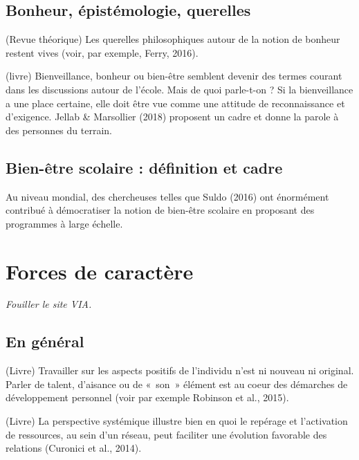 \documentclass[
  french,
]{article}
\begin{document}
\hypertarget{bonheur-uxe9pistuxe9mologie-querelles}{%
\subsection{Bonheur, épistémologie, querelles}\label{bonheur-uxe9pistuxe9mologie-querelles}}

(Revue théorique) Les querelles philosophiques autour de la notion de bonheur restent vives (voir, par exemple, Ferry, 2016).

(livre) Bienveillance, bonheur ou bien-être semblent devenir des termes courant dans les discussions autour de l'école. Mais de quoi parle-t-on ? Si la bienveillance a une place certaine, elle doit être vue comme une attitude de reconnaissance et d'exigence. Jellab \& Marsollier (2018) proposent un cadre et donne la parole à des personnes du terrain.

\hypertarget{bien-uxeatre-scolaire-duxe9finition-et-cadre}{%
\subsection{Bien-être scolaire : définition et cadre}\label{bien-uxeatre-scolaire-duxe9finition-et-cadre}}

Au niveau mondial, des chercheuses telles que Suldo (2016) ont énormément contribué à démocratiser la notion de bien-être scolaire en proposant des programmes à large échelle.

\hypertarget{forces-de-caractuxe8re}{%
\section{Forces de caractère}\label{forces-de-caractuxe8re}}

\emph{Fouiller le site VIA.}

\hypertarget{en-guxe9nuxe9ral}{%
\subsection{En général}\label{en-guxe9nuxe9ral}}

(Livre) Travailler sur les aspects positifs de l'individu n'est ni nouveau ni original. Parler de talent, d'aisance ou de «~son~» élément est au coeur des démarches de développement personnel (voir par exemple Robinson et al., 2015).

(Livre) La perspective systémique illustre bien en quoi le repérage et l'activation de ressources, au sein d'un réseau, peut faciliter une évolution favorable des relations (Curonici et al., 2014).
\end{document}
